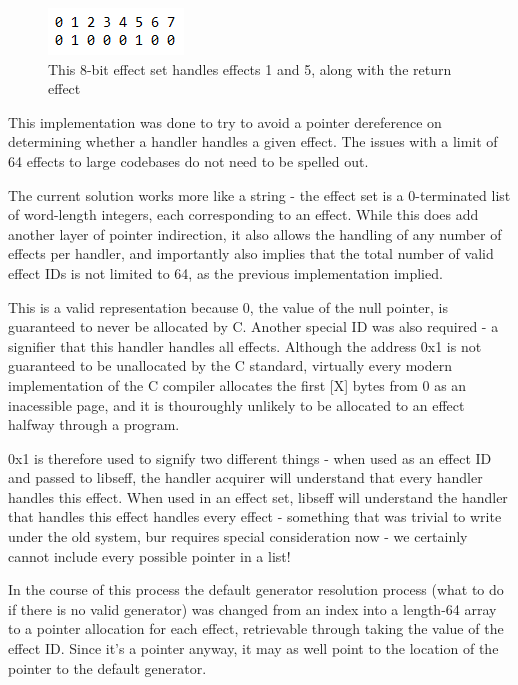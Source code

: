 \documentclass[logo,bsc,singlespacing,parskip,online]{infthesis}
\begin{document}
\begin{figure}[h]
    \centering
    \includegraphics[width=0.3\linewidth]{effect_set.png}
    \caption{This 8-bit effect set handles effects 1 and 5, along with the return effect}
\end{figure}

This implementation was done to try to avoid a pointer dereference on determining whether a handler handles a given effect. The issues with a limit of 64 effects to large codebases do not need to be spelled out.

The current solution works more like a string - the effect set is a 0-terminated list of word-length integers, each corresponding to an effect. While this does add another layer of pointer indirection, it also allows the handling of any number of effects per handler, and importantly also implies that the total number of valid effect IDs is not limited to 64, as the previous implementation implied.

This is a valid representation because 0, the value of the null pointer, is guaranteed to never be allocated by C. Another special ID was also required - a signifier that this handler handles all effects. Although the address 0x1 is not guaranteed to be unallocated by the C standard, virtually every modern implementation of the C compiler allocates the first [X] bytes from 0 as an inacessible page, and it is thouroughly unlikely to be allocated to an effect halfway through a program.

0x1 is therefore used to signify two different things - when used as an effect ID and passed to libseff, the handler acquirer will understand that every handler handles this effect. When used in an effect set, libseff will understand the handler that handles this effect handles every effect - something that was trivial to write under the old system, bur requires special consideration now - we certainly cannot include every possible pointer in a list!

In the course of this process the default generator resolution process (what to do if there is no valid generator) was changed from an index into a length-64 array to a pointer allocation for each effect, retrievable through taking the value of the effect ID. Since it's a pointer anyway, it may as well point to the location of the pointer to the default generator.
\end{document}
